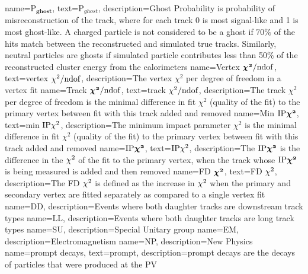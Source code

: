 {
	name=P$\mathbold{_{ghost}}$,%
		text=P$_{ghost}$,
		description={Ghost Probability is probability of misreconstruction of the track, where for each track 0 is most signal-like and 1 is most ghost-like. A charged particle is not considered to be a ghost if 70$\%$ of the hits match between the reconstructed and simulated true tracks. Similarly, neutral particles are ghosts if simulated particle contributes less than 50$\%$ of the reconstructed cluster energy from the calorimeters} 
}                
{
	        name={Vertex $\mathbold{\chisq/\rm{ndof}}$},
		text={vertex ${\chi^2/\rm{ndof}}$},
		description={The vertex $\chi^{2}$ per degree of freedom in a vertex fit} %
		}
{
	        name={Track $\mathbold{\chisq/\rm{ndof}}$},
		text={track $\chi^2/\rm{ndof}$},
		description={The track $\chi^{2}$ per degree of freedom is the minimal difference in fit $\chi^{2}$ (quality of the fit) to the primary vertex between fit with this track added  and removed} %
		}
{
	        name={Min $\mathbold{\mathrm{IP}\chisq}$},
		text={min $\mathrm{IP}\chi^2$},
		description={The minimum impact parameter $\chi^{2}$ is the minimal difference in fit $\chi^{2}$ (quality of the fit) to the primary vertex between fit with this track added  and removed} %
		}
{
	name=$\mathbold{\mathrm{IP}\chisq}$,
		text=$\mathrm{IP}\chi^2$,
		description={The $\mathbold{\mathrm{IP}\chisq}$ is the difference in the $\chi^2$ of the fit to the primary vertex, when the track whose $\mathbold{\mathrm{IP}\chisq}$ is being measured is added and then removed}
} 
{
	        name=FD $\mathbold{\chisq}$,
		text=FD $\chi^2$,
		description={The \Gls{FD} $\chi^2$ is defined as the increase in $\chi^2$ when the primary and secondary vertex are fitted separately as compared to a single vertex fit}
}                
{
	name=DD,
		description={Events where both daughter tracks are downstream track types}
}
{
	name=LL,
		description={Events where both daughter tracks are long track types}
}
{
	name=SU,
		description={Special Unitary group}
}                 
{
	name=EM,
		description={Electromagnetism}
}                 
{
	name=NP,
		description={New Physics}
}
{
	name=prompt decays,
		text=prompt,
		description={prompt decays are the decays of particles that were produced at the \Gls{PV}}
}


